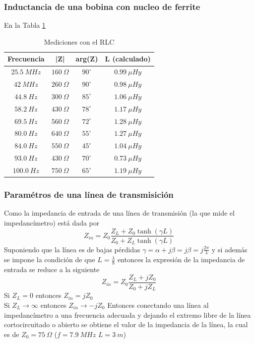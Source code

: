 \documentclass[a4paper,10pt]{article}
\begin{document}
		\subsubsection{Inductancia de una bobina con nucleo de ferrite}
		En la Tabla \ref{tabIMPbobina}
		\begin{table}[!htp]
					\centering
					\begin{tabular}{|c|c|c|c}
						\hline
			    		Frecuencia & |Z| & arg(Z)  & L (calculado) \\
						\hline
						$25.5~MHz$ & $160~\Omega$ & $90^{\circ}$ & $0.99~\mu Hy$ \\
						\hline
						$42~MHz$ & $260~\Omega$ & $90^{\circ}$ & $0.98~\mu Hy$\\
						\hline
						$44.8~Hz$ & $300~\Omega$ & $85^{\circ}$ & $1.06~\mu Hy$ \\
						\hline
						$58.2~Hz$ & $430~\Omega$ & $78^{\circ}$ & $1.17~\mu Hy$ \\
						\hline									
						$69.5~Hz$ & $560~\Omega$ & $72^{\circ}$ & $1.28~\mu Hy$ \\
						\hline									
						$80.0~Hz$& $640~\Omega$ & $55^{\circ}$ & $1.27~\mu Hy$ \\
						\hline									
						$84.0~Hz$ & $550~\Omega$ & $45^{\circ}$ & $1.04~\mu Hy$ \\
						\hline									
						$93.0~Hz$ & $430~\Omega$ & $70^{\circ}$ & $0.73~\mu Hy$ \\
						\hline									
						$100.0~Hz$ & $750~\Omega$ & $65^{\circ}$ & $1.19~\mu Hy$ \\
						\hline			
					\end{tabular}
					\caption{Mediciones con el RLC} \label{tabIMPbobina}
				\end{table}	
					
		\subsubsection{Param\'etros de una l\'inea de transmisici\'on}
		Como la impedancia de entrada de una l\'inea de transmisi\'on (la que mide el impedanc\'imetro) est\'a dada por $$Z_{in}=Z_0\frac{Z_L+Z_0\tanh(\gamma L)}{Z_0+Z_L\tanh(\gamma L)}$$
		Suponiendo que la l\'inea es de bajas p\'erdidas $\gamma=\alpha+j\beta=j\beta=j\frac{2\pi}{\lambda}$ y si adem\'as se impone la condici\'on de que $L=\frac{\lambda}{8}$ entonces la expresi\'on de la impedancia de entrada se reduce a la siguiente
		$$Z_{in}=Z_0\frac{Z_L+jZ_0}{Z_0+jZ_L}$$
		Si $Z_L= 0$ entonces $Z_{in}=jZ_0$ \\
		Si $Z_L \rightarrow \infty$ entonces $Z_{in}\rightarrow-jZ_0$
		Entonces conectando una l\'inea al impedanc\'imetro a una frecuencia adecuada y dejando el extremo libre de la l\'inea cortocircuitado o abierto se obtiene el valor de la impedancia de la l\'inea, la cual es de $Z_0=75~\Omega$ ($f=7.9~MHz$ $L=3~m$)
		
\end{document}
